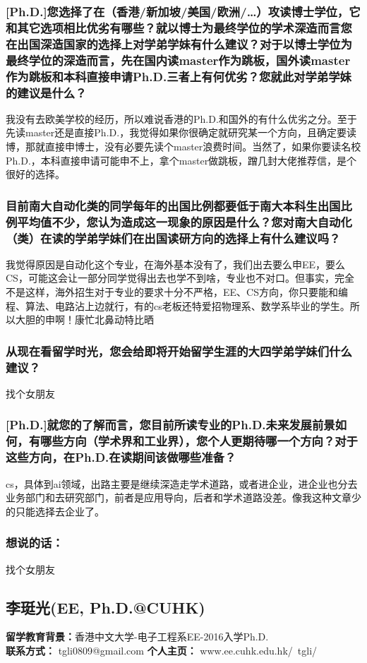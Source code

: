 \documentclass[a4paper,UTF8]{book}
\begin{document}
    \subsubsection*{[Ph.D.]您选择了在（香港/新加坡/美国/欧洲/…）攻读博士学位，它和其它选项相比优劣有哪些？就以博士为最终学位的学术深造而言您在出国深造国家的选择上对学弟学妹有什么建议？对于以博士学位为最终学位的深造而言，先在国内读master作为跳板，国外读master作为跳板和本科直接申请Ph.D.三者上有何优劣？您就此对学弟学妹的建议是什么？}
    我没有去欧美学校的经历，所以难说香港的Ph.D.和国外的有什么优劣之分。至于先读master还是直接Ph.D.，我觉得如果你很确定就研究某一个方向，且确定要读博，那就直接申博士，没有必要先读个master浪费时间。当然了，如果你要读名校Ph.D.，本科直接申请可能申不上，拿个master做跳板，蹭几封大佬推荐信，是个很好的选择。

    \subsubsection*{目前南大自动化类的同学每年的出国比例都要低于南大本科生出国比例平均值不少，您认为造成这一现象的原因是什么？您对南大自动化（类）在读的学弟学妹们在出国读研方向的选择上有什么建议吗？}
    我觉得原因是自动化这个专业，在海外基本没有了，我们出去要么申EE，要么CS，可能这会让一部分同学觉得出去也学不到啥，专业也不对口。但事实，完全不是这样，海外招生对于专业的要求十分不严格，EE、CS方向，你只要能和编程、算法、电路沾上边就行，有的cs老板还特爱招物理系、数学系毕业的学生。所以大胆的申啊！康忙北鼻动特比晒
    \subsubsection*{从现在看留学时光，您会给即将开始留学生涯的大四学弟学妹们什么建议？}
    找个女朋友
    \subsubsection*{[Ph.D.]就您的了解而言，您目前所读专业的Ph.D.未来发展前景如何，有哪些方向（学术界和工业界），您个人更期待哪一个方向？对于这些方向，在Ph.D.在读期间该做哪些准备？}
    cs，具体到ai领域，出路主要是继续深造走学术道路，或者进企业，进企业也分去业务部门和去研究部门，前者是应用导向，后者和学术道路没差。像我这种文章少的只能选择去企业了。
    \subsubsection{想说的话：}
    找个女朋友
        
\clearpage
\subsection{李珽光(EE, Ph.D.@CUHK)}
    \textbf{留学教育背景：}香港中文大学-电子工程系EE-2016入学Ph.D.\\
    \textbf{联系方式：} tgli0809@gmail.com
    \textbf{个人主页：} www.ee.cuhk.edu.hk/~tgli/
\end{document}
